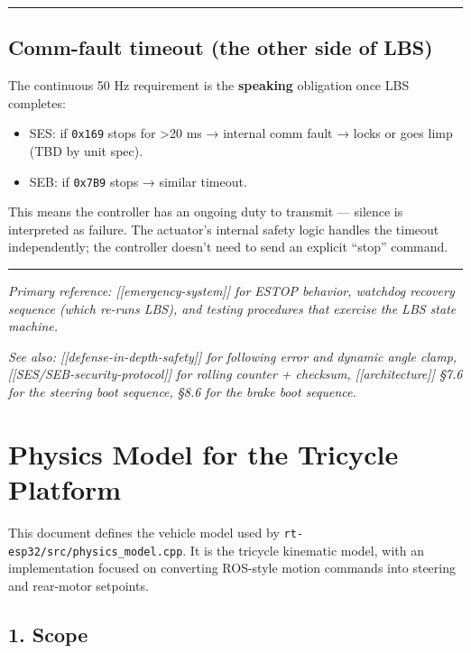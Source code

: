 \documentclass[12pt,a4paper,oneside]{report}
\providecommand{\tightlist}{\setlength{\itemsep}{0pt}\setlength{\parskip}{0pt}}
\begin{document}
\begin{center}\rule{0.5\linewidth}{0.5pt}\end{center}

\section{Comm-fault timeout (the other side of
LBS)}\label{comm-fault-timeout-the-other-side-of-lbs}

The continuous 50 Hz requirement is the \textbf{speaking} obligation once LBS
completes:

\begin{itemize}
\tightlist
\item
  SES: if \texttt{0x169} stops for \textgreater20 ms → internal comm fault →
  locks or goes limp (TBD by unit spec).
\item
  SEB: if \texttt{0x7B9} stops → similar timeout.
\end{itemize}

This means the controller has an ongoing duty to transmit --- silence is
interpreted as failure. The actuator's internal safety logic handles the timeout
independently; the controller doesn't need to send an explicit ``stop'' command.

\begin{center}\rule{0.5\linewidth}{0.5pt}\end{center}

\emph{Primary reference: {[}{[}emergency-system{]}{]} for ESTOP behavior,
watchdog recovery sequence (which re-runs LBS), and testing procedures that
exercise the LBS state machine.}

\emph{See also: {[}{[}defense-in-depth-safety{]}{]} for following error and
dynamic angle clamp, {[}{[}SES/SEB-security-protocol{]}{]} for rolling counter +
checksum, {[}{[}architecture{]}{]} §7.6 for the steering boot sequence, §8.6 for
the brake boot sequence.}


\chapter{Physics Model for the Tricycle
Platform}\label{physics-model-for-the-tricycle-platform}

This document defines the vehicle model used by
\texttt{rt-esp32/src/physics\_model.cpp}. It is the tricycle kinematic model,
with an implementation focused on converting ROS-style motion commands into
steering and rear-motor setpoints.

\section{1. Scope}\label{scope}
\end{document}
